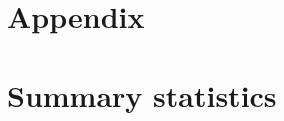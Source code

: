 \documentclass[11pt]{article}
\begin{document}
\newpage

\begin{subappendices}
\appendix

\section*{Appendix}\label{Appendix}
\singlespacing
\section{Summary statistics}\label{ASec:xxxxx}
	
\end{subappendices}	



\newpage
{\footnotesize 
	
	\singlespacing
	
}


\end{document}
